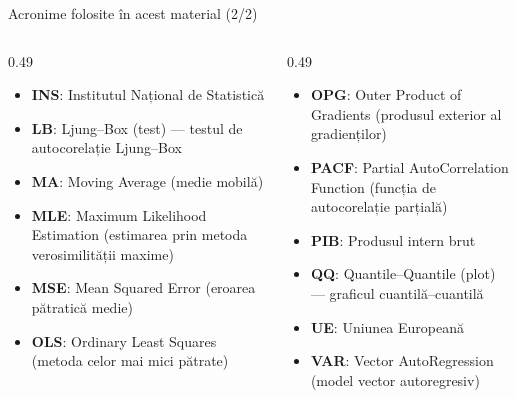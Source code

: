 \begin{frame}{Acronime folosite în acest material (2/2)}
\begin{columns}[T]
\begin{column}{0.49\textwidth}
\begin{itemize}\setlength{\itemsep}{0pt}
    \item \textbf{INS}: Institutul Național de Statistică
    \item \textbf{LB}: Ljung–Box (test) — testul de autocorelație Ljung–Box
    \item \textbf{MA}: Moving Average (medie mobilă)
    \item \textbf{MLE}: Maximum Likelihood Estimation (estimarea prin metoda verosimilității maxime)
    \item \textbf{MSE}: Mean Squared Error (eroarea pătratică medie)
    \item \textbf{OLS}: Ordinary Least Squares (metoda celor mai mici pătrate)
\end{itemize}
\end{column}
\begin{column}{0.49\textwidth}
\begin{itemize}\setlength{\itemsep}{0pt}
    \item \textbf{OPG}: Outer Product of Gradients (produsul exterior al gradienților)
    \item \textbf{PACF}: Partial AutoCorrelation Function (funcția de autocorelație parțială)
    \item \textbf{PIB}: Produsul intern brut
    \item \textbf{QQ}: Quantile–Quantile (plot) — graficul cuantilă–cuantilă
    \item \textbf{UE}: Uniunea Europeană
    \item \textbf{VAR}: Vector AutoRegression (model vector autoregresiv)
\end{itemize}
\end{column}
\end{columns}
\end{frame}

